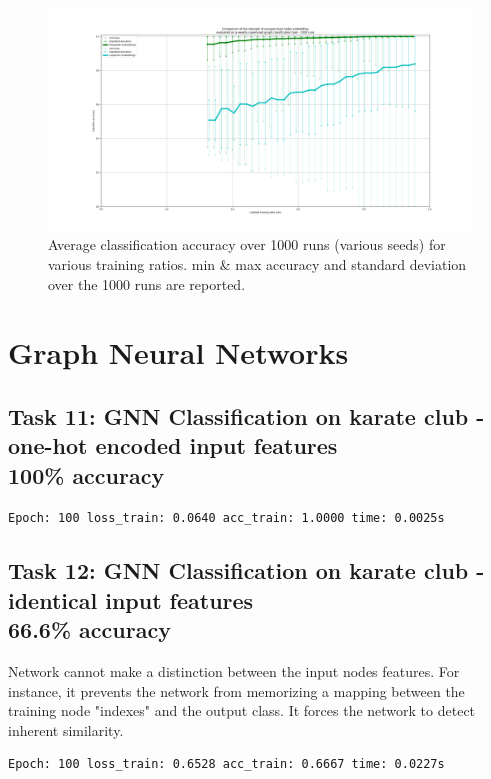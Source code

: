 \documentclass[a4paper]{article}
\begin{document}
\begin{figure}[ht]
    \centering
    \includegraphics[width=1.\textwidth]{figures/deepwalk_vs_laplacian_embeddings_1000runs.png}
    \caption{Average classification accuracy over 1000 runs (various seeds) for various training ratios. 
    min \& max accuracy and standard deviation over the 1000 runs are reported.}
    \label{fig:deepwalk_vs_laplacian_embdeddings}
\end{figure}

\break

\section{Graph Neural Networks}
\subsection*{Task 11: GNN Classification on karate club - one-hot encoded input features \\ 100\% accuracy}
\begin{verbatim}
Epoch: 100 loss_train: 0.0640 acc_train: 1.0000 time: 0.0025s
\end{verbatim}

\subsection*{Task 12: GNN Classification on karate club - identical input features \\ 66.6\% accuracy}
Network cannot make a distinction between the input nodes features.
For instance, it prevents the network from memorizing a mapping between the training node "indexes" and the output class.
It forces the network to detect inherent similarity.

\begin{verbatim}
Epoch: 100 loss_train: 0.6528 acc_train: 0.6667 time: 0.0227s
\end{verbatim}

\end{document}

